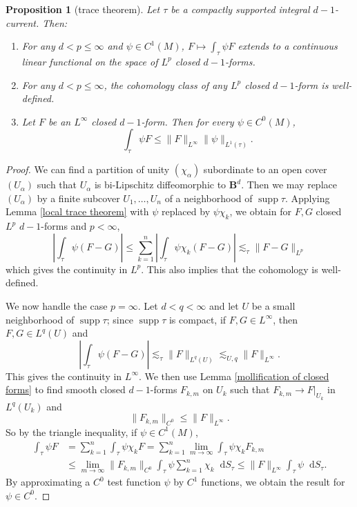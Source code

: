 \documentclass[reqno,11pt]{amsart}
\newcommand{\Ball}{\mathbf{B}}
\newcommand*\dif{\mathop{}\!\mathrm{d}}
\DeclareMathOperator{\supp}{supp}
\newtheorem{proposition}[theorem]{Proposition}
\theoremstyle{definition}
\numberwithin{equation}{section}
\begin{document}
\begin{proposition}[trace theorem]\label{integration is welldefined}
Let $\tau$ be a compactly supported integral $d-1$-current.
Then:
\begin{enumerate}
\item For any $d < p \leq \infty$ and $\psi \in C^1(M)$, $F \mapsto \int_\tau \psi F$ extends to a continuous linear functional on the space of $L^p$ closed $d-1$-forms.
\item For any $d < p \leq \infty$, the cohomology class of any $L^p$ closed $d - 1$-form is well-defined.
\item Let $F$ be an $L^\infty$ closed $d - 1$-form. Then for every $\psi \in C^0(M)$,
\begin{equation}\label{integral over chain is linfinity}
	\int_\tau \psi F \leq \|F\|_{L^\infty} \|\psi\|_{L^1(\tau)}.
\end{equation}
\end{enumerate}
\end{proposition}
\begin{proof}
We can find a partition of unity $(\chi_\alpha)$ subordinate to an open cover $(U_\alpha)$ such that $U_\alpha$ is bi-Lipschitz diffeomorphic to $\Ball^d$.
Then we may replace $(U_\alpha)$ by a finite subcover $U_1, \dots, U_n$ of a neighborhood of $\supp \tau$.
Applying Lemma \ref{local trace theorem} with $\psi$ replaced by $\psi \chi_k$, we obtain for $F, G$ closed $L^p$ $d - 1$-forms and $p < \infty$,
$$\left|\int_\tau \psi(F - G)\right| \leq \sum_{k = 1}^n \left|\int_\tau \psi \chi_k (F - G)\right| \lesssim_\tau \|F - G\|_{L^p}$$
which gives the continuity in $L^p$.
This also implies that the cohomology is well-defined.

We now handle the case $p = \infty$.
Let $d < q < \infty$ and let $U$ be a small neighborhood of $\supp \tau$; since $\supp \tau$ is compact, if $F, G \in L^\infty$, then $F, G \in L^q(U)$ and 
$$\left|\int_\tau \psi(F - G)\right| \lesssim_\tau \|F\|_{L^q(U)} \lesssim_{U, q} \|F\|_{L^\infty}.$$
This gives the continuity in $L^\infty$.
We then use Lemma \ref{mollification of closed forms} to find smooth closed $d - 1$-forms $F_{k, m}$ on $U_k$ such that $F_{k, m} \to F|_{U_k}$ in $L^q(U_k)$ and
$$\|F_{k, m}\|_{C^0} \leq \|F\|_{L^\infty}.$$
So by the triangle inequality, if $\psi \in C^1(M)$,
\begin{align*}
\int_\tau \psi F 
&= \sum_{k = 1}^n \int_\tau \psi \chi_k F 
= \sum_{k = 1}^n \lim_{m \to \infty} \int_\tau \psi \chi_k F_{k, m} \\
&\leq \lim_{m \to \infty} \|F_{k, m}\|_{C^0} \int_\tau \psi \sum_{k = 1}^n \chi_k \dif S_\tau 
\leq \|F\|_{L^\infty} \int_\tau \psi \dif S_\tau.
\end{align*}
By approximating a $C^0$ test function $\psi$ by $C^1$ functions, we obtain the result for $\psi \in C^0$.
\end{proof}
\end{document}
